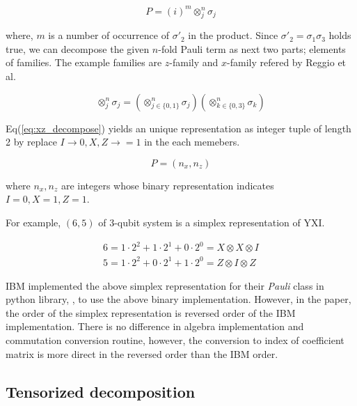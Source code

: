 \documentclass[twocolumn]{article}
\begin{document}
\begin{equation}
    P = (i)^m \otimes_j^n \sigma_j
\end{equation}

where, $m$ is a number of occurrence of $\sigma'_2$ in the product.
Since $\sigma'_2 = \sigma_1 \sigma_3$ holds true, we can decompose the given $n$-fold Pauli term as next two
parts; elements of families. 
The example families are $z$-family and $x$-family refered by Reggio et al\cite{reggio_fast_2023}.

\begin{equation}
    \label{eq:xz_decompose}
    \otimes_j^n \sigma_j = \left( \otimes_{j \in \{0, 1\}}^n \sigma_j \right) \left( \otimes_{k \in \{0, 3\}}^n \sigma_k \right)
\end{equation}

Eq(\ref{eq:xz_decompose}) yields an unique representation as integer tuple of length 2 by 
replace $I \rightarrow 0, X, Z \rightarrow =1$ in the each memebers.

\begin{equation}
    P = (n_x, n_z)
\end{equation}

where $n_x, n_z$ are integers whose binary representation indicates $I=0, X=1, Z=1$.

For example, $(6, 5)$ of 3-qubit system is a simplex representation of $\text{YXI}$.

\begin{equation}
    \begin{array}{c}
        6 = 1 \cdot 2^2 +1 \cdot 2^1 + 0 \cdot 2^0 = X \otimes X \otimes I\\
        5 = 1 \cdot 2^2 +0 \cdot 2^1 + 1 \cdot 2^0 = Z \otimes I \otimes Z
    \end{array}
\end{equation}


IBM implemented the above simplex representation 
for their \textit{Pauli} class in python library, ,
to use the above binary implementation\cite{Qiskit}. 
However, in the paper, the order of the simplex representation 
is reversed order of the IBM implementation. 
There is no difference in algebra implementation and 
commutation conversion routine, however, the conversion to index of coefficient
matrix is more direct in the reversed order than the IBM order.

\subsection{Tensorized decomposition}
\end{document}
